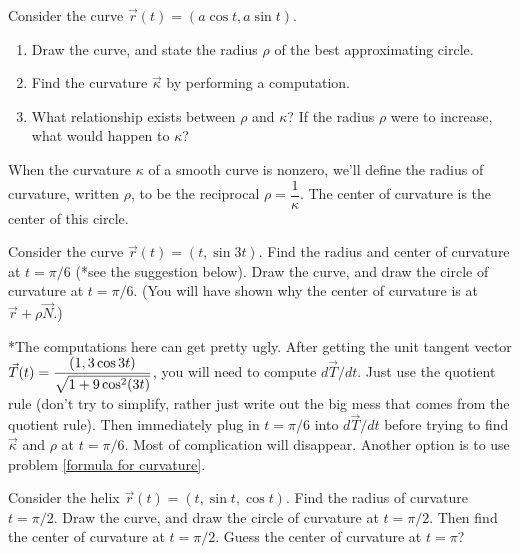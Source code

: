 \begin{problem}
 Consider the curve $\vec r(t)=(a\cos t, a\sin t)$.
 \begin{enumerate}
  \item Draw the curve, and state the radius $\rho$ of the best approximating circle.
  \item Find the curvature $\vec \kappa$ by performing a computation.
  \item What relationship exists between $\rho$ and $\kappa$?  If the radius $\rho$ were to increase, what would happen to $\kappa$?
 \end{enumerate}
\end{problem}


\begin{definition}%
When the curvature $\kappa$ of a smooth curve is nonzero, we'll define the radius of curvature, written $\rho$, to be the reciprocal $\rho = \dfrac{1}{\kappa}$. The center of curvature is the center of this circle.
\end{definition}

\begin{problem}
 Consider the curve $\vec r(t)=(t,\sin 3 t)$. Find the radius and center of curvature at $t=\pi/6$ (*see the suggestion below). Draw the curve, and draw the circle of curvature at $t=\pi/6$. 
 (You will have shown why the center of curvature is at $\vec r + \rho \vec N$.)
 
*The computations here can get pretty ugly. After getting the unit tangent vector $\displaystyle \vec T(t) = \frac{(1,3\cos 3t)}{\sqrt{1+9\cos^2(3t)}}$, you will need to compute $d\vec T/dt$. Just use the quotient rule (don't try to simplify, rather just write out the big mess that comes from the quotient rule).  Then immediately plug in $t=\pi/6$ into $d\vec T/dt$ before trying to find $\vec \kappa$ and $\rho$ at $t=\pi/6$. Most of complication will disappear. Another option is to use problem   \ref{formula for curvature}. 
\end{problem}

\begin{problem}
 Consider the helix $\vec r(t)=(t,\sin t,\cos t)$. Find the radius of curvature $t=\pi/2$. Draw the curve, and draw the circle of curvature at $t=\pi/2$. Then find the center of curvature at $t=\pi/2$. Guess the center of curvature at $t=\pi$?
\end{problem}


